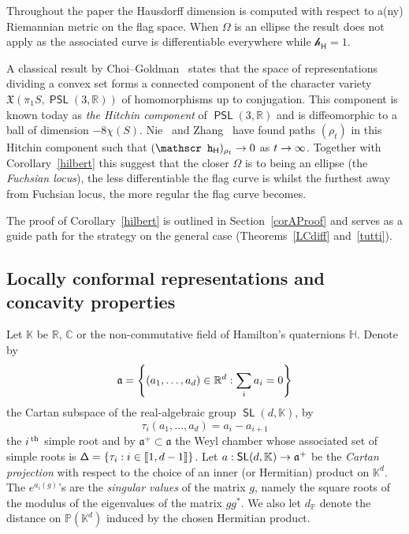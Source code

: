\documentclass[AHL,Unicode,longabstracts,MathTools]{cedram}
\newcommand{\cartan}{a}
\DeclareMathOperator{\SL}{{\mathsf{SL}}}
\DeclareMathOperator{\PSL}{{\mathsf{PSL}}}
\newcommand{\scr}{\mathscr}
\newcommand{\hJ}[1]{{\scr h}_{#1}}
\renewcommand{\sf}[1]{{\mathsf{#1}}}
\newcommand{\R}{\mathbb{R}}
\newcommand{\C}{\mathbb{C}}
\renewcommand{\P}{\mathbb{P}}
\renewcommand{\H}{\mathbb{H}}
\newcommand{\K}{\mathbb{K}}
\newcommand{\piS}{\pi_1S}
\newcommand{\simple}{{\sf \Delta}}
\newcommand{\slroot}{{\tau}}
\renewcommand{\/}{\backslash}
\newcommand{\<}{\langle}
\renewcommand{\>}{\rangle}
\renewcommand{\a}{\mathfrak{a}}
\newcommand{\fkX}{\mathfrak{X}}
\renewcommand*{\to}{\mathchoice{\longrightarrow}{\rightarrow}{\rightarrow}{\rightarrow}}
\let\originalleft\left
\let\originalright\right
\renewcommand{\left}{\mathopen{}\mathclose\bgroup\originalleft}
\renewcommand{\right}{\aftergroup\egroup\originalright}
\newcommand{\llbracket}{\mathopen{[\mkern -2.7mu[}}
\newcommand{\rrbracket}{\mathclose{]\mkern -2.7mu]}}
\newcommand{\lb}{\llbracket}
\newcommand{\rb}{\rrbracket}
\begin{document}
Throughout the paper the Hausdorff dimension is computed with respect to a(ny) Riemannian metric on the flag space. When $\Omega$ is an ellipse the result does not apply as the associated curve is differentiable everywhere while $\hJ{\sf H}=1$.


A classical result by Choi--Goldman~\cite{choigoldman} states that the space of representations dividing a convex set forms a connected component of the character variety $\fkX(\piS,\PSL(3,\R))$ of homomorphisms up to conjugation. This component is known today as \emph{the Hitchin component} of $\PSL(3,\R)$ and is diffeomorphic to a ball of dimension $-8\chi(S)$. Nie~\cite{Nie0} and Zhang~\cite{ZhangSL3} have found paths $(\rho_t)$ in this Hitchin component such that $({\hJ{\sf H}})_{\rho_t}\to 0$ as $t\to\infty$. Together with Corollary~\ref{hilbert} this suggest that the closer $\Omega$ is to being an ellipse (the \emph{Fuchsian locus}), the less differentiable the flag curve is whilst the furthest away from Fuchsian locus, the more regular the flag curve becomes.



The proof of Corollary~\ref{hilbert} is outlined in Section~\ref{corAProof} and serves as a guide path for the strategy on the general case (Theorems~\ref{LCdiff} and~\ref{tutti}).


\subsection{Locally conformal representations and concavity properties}\label{2hyper}

Let $\K$ be $\R$, $\C$ or the non-commutative field of Hamilton's quaternions $\H$. Denote by
\[
\a=\left\{(a_1,\dots,a_d)\in\R^d:\sum_i a_i=0\right\}
\]
the Cartan subspace of the real-algebraic group $\SL(d,\K)$, by
\begin{equation}\label{e.slroot}
\slroot_i(a_1,\dots,a_d)=a_i-a_{i+1}
\end{equation}
the $i^{\, \rm th}$ simple root and by $\a^+\subset \a$ the Weyl chamber whose associated set of simple roots is $\simple=\{\slroot_i:i\in\lb1,d-1\rb\}$. Let $\cartan:\SL(d,\K)\to\a^+$ be the \emph{Cartan projection} with respect to the choice of an inner (or Hermitian) product on $\K^d$. The $e^{\cartan_i(g)}$'s are the \emph{singular values} of the matrix $g$, namely the square roots of the modulus of the eigenvalues of the matrix $gg^*$. We also let $d_\P$ denote the distance on $\P(\K^d)$ induced by the chosen Hermitian product.
\end{document}
